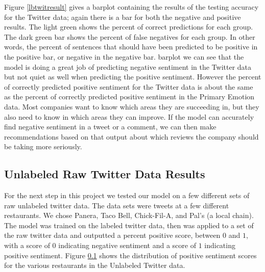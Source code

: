 \documentclass[titlepage,letterpaper]{article}
\begin{document}
Figure \ref{lbtwitresult} gives a barplot containing the results of the testing accuracy for the Twitter data; again there is a bar for both the negative and positive results. The light green shows the percent of correct predictions for each group. The dark green bar shows the percent of false negatives for each group. In other words, the percent of sentences that should have been predicted to be positive in the positive bar, or negative in the negative bar. 
 barplot we can see that the model is doing a great job of predicting negative sentiment in the Twitter data but not quiet as well when predicting the positive sentiment. However the percent of correctly predicted positive sentiment for the Twitter data is about the same as the percent of correctly predicted positive sentiment in the Primary Emotion data. Most companies want to know which areas they are succeeding in, but they also need to know in which areas they can improve. If the model can accurately find negative sentiment in a tweet or a comment, we can then make recommendations based on that output about which reviews the company should be taking more seriously. 



\subsection{Unlabeled Raw Twitter Data Results}


\label{twitmeg}

For the next step in this project we tested our model on a few different sets of raw unlabeled twitter data. The data sets were tweets at a few different restaurants. We chose Panera, Taco Bell, Chick-Fil-A, and Pal's (a local chain). The model was trained on the labeled twitter data, then was applied to a set of the raw twitter data and outputted a percent positive score, between $0$ and $1$, with a score of $0$ indicating negative sentiment and a score of $1$ indicating positive sentiment. Figure \ref{twitmeg} shows the distribution of positive sentiment scores for the various restaurants in the Unlabeled Twitter data.
\end{document}
